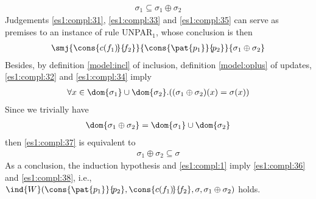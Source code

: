 \begin{enumerate}
\begin{gather}
      \sigma_1 \subseteq \sigma_1 \oplus \sigma_2 \label{es1:compl:35}
    \end{gather}
    Judgements \eqref{es1:compl:31}, \eqref{es1:compl:33} and
    \eqref{es1:compl:35} can serve as premises to an instance of rule
    \textsf{UNPAR}\(_1\), whose conclusion is then
    \begin{gather}
      \smj{\cons{c(f_1)\!}{\!f_2}}%
          {\cons{\pat{{p}_1}}{\!{p}_2}}%
          {\sigma_1 \oplus \sigma_2} \label{es1:compl:36}
    \end{gather}
    Besides, by definition \eqref{model:incl} of inclusion, definition
    \eqref{model:oplus} of updates, \eqref{es1:compl:32} and
    \eqref{es1:compl:34} imply
    \begin{gather}
      \forall x \in \dom{\sigma_1} \cup \dom{\sigma_2}.((\sigma_1
      \oplus \sigma_2)(x) = \sigma(x)) \label{es1:compl:37}
    \end{gather}
    Since we trivially have
    \begin{gather*}
      \dom{\sigma_1 \oplus \sigma_2} = \dom{\sigma_1} \cup
      \dom{\sigma_2}
    \end{gather*}
    then \eqref{es1:compl:37} is equivalent to
    \begin{gather}
      \sigma_1 \oplus \sigma_2 \subseteq \sigma \label{es1:compl:38}
    \end{gather}
    As a conclusion, the induction hypothesis and \eqref{es1:compl:1}
    imply \eqref{es1:compl:36} and \eqref{es1:compl:38}, i.e.,
    \(\ind{W}(\cons{\pat{{p}_1}}{\!{p}_2},
    \cons{c(f_1)\!}{\!f_2}, \sigma, \sigma_1 \oplus \sigma_2)\) holds.


\end{enumerate}

